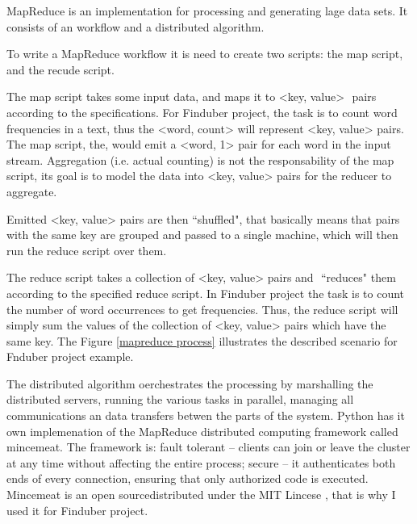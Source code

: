 MapReduce is an implementation for processing and generating lage data sets. It consists of an workflow and a distributed algorithm. 

To write a MapReduce workflow it is need to create two scripts: the map script, and the recude script. 

The map script takes some input data, and maps it to <key, value> 
pairs according to the specifications. For Finduber project, the task is to count word  frequencies in a text, thus the <word, count> will represent <key, value> pairs. The map script, the, would emit a <word, 1> pair for each word in the input stream. Aggregation (i.e. actual counting) is not the responsability of the map script, its goal is to model the data into <key, value> pairs for the reducer to aggregate.

Emitted <key, value> pairs are then ``shuffled", that basically means that pairs with the same key are grouped and passed to a single machine, which will then run the reduce script over them.

The reduce script takes a collection of <key, value> pairs and 
``reduces" them according to the specified reduce script. In Finduber project the task is to count the number of word occurrences to get frequencies. Thus, the reduce script will simply sum the values of the collection of <key, value> pairs which have the same key. The Figure \ref{mapreduce process} illustrates the described scenario for Fnduber project example.


The distributed algorithm oerchestrates the processing by marshalling the distributed servers, running the various tasks in parallel, managing all communications an data transfers betwen the parts of the system. Python has it own implemenation of the MapReduce distributed computing framework called mincemeat. The framework is: fault tolerant -- clients can join or leave the cluster at any time without affecting the entire process; secure -- it authenticates both ends of every connection, ensuring that only authorized code is executed. Mincemeat is an open sourcedistributed under the MIT Lincese , that is why I used it for Finduber project. 























